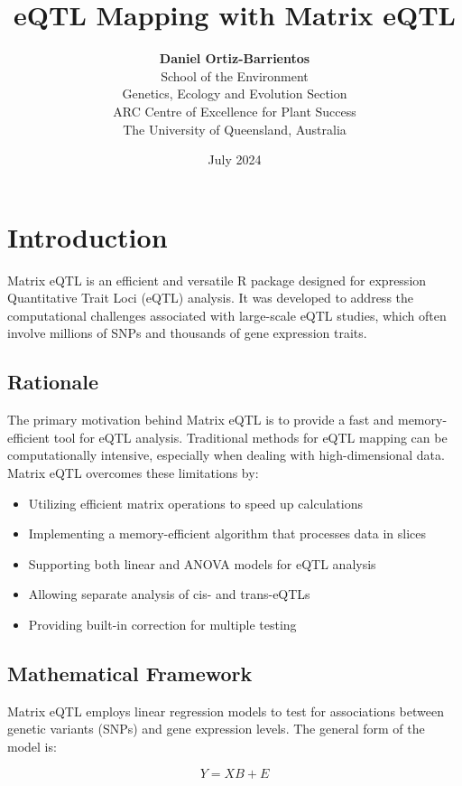 \documentclass[12pt,a4paper]{article}
\title{\textcolor{uqpurple}{eQTL Mapping with Matrix eQTL}}
\author{
    \textbf{Daniel Ortiz-Barrientos}\\
    \small School of the Environment\\
    \small Genetics, Ecology and Evolution Section\\
    \small ARC Centre of Excellence for Plant Success\\
    \small The University of Queensland, Australia
}
\date{July 2024}
\begin{document}
\maketitle


\section{Introduction}

Matrix eQTL is an efficient and versatile R package designed for expression Quantitative Trait Loci (eQTL) analysis. It was developed to address the computational challenges associated with large-scale eQTL studies, which often involve millions of SNPs and thousands of gene expression traits.

\subsection{Rationale}

The primary motivation behind Matrix eQTL is to provide a fast and memory-efficient tool for eQTL analysis. Traditional methods for eQTL mapping can be computationally intensive, especially when dealing with high-dimensional data. Matrix eQTL overcomes these limitations by:

\begin{itemize}
    \item Utilizing efficient matrix operations to speed up calculations
    \item Implementing a memory-efficient algorithm that processes data in slices
    \item Supporting both linear and ANOVA models for eQTL analysis
    \item Allowing separate analysis of cis- and trans-eQTLs
    \item Providing built-in correction for multiple testing
\end{itemize}

\subsection{Mathematical Framework}

Matrix eQTL employs linear regression models to test for associations between genetic variants (SNPs) and gene expression levels. The general form of the model is:

\begin{equation}
Y = XB + E
\end{equation}
\end{document}
